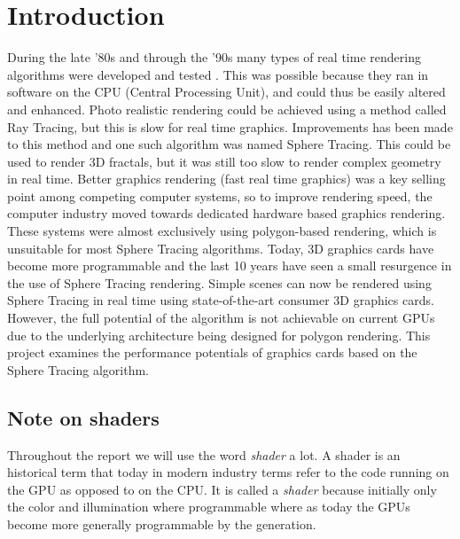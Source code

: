 \chapter{Introduction} 	

	During the late '80s and through the '90s many types of real time rendering
	algorithms were developed and tested \cite{Hart1989}. This was possible
	because they ran in software on the	CPU (Central Processing Unit), and
	could thus be easily altered and enhanced. Photo realistic rendering could
	be achieved using a method called Ray Tracing, but this is slow for real time
	graphics\cite{PeterShirleyMichaelAshikhmin2005}. Improvements has been made 
	to this method and one
	such algorithm was named Sphere Tracing. This could be used to render 3D
	fractals\cite{Hart1989}, but it was	still too slow to render complex
	geometry in real time\cite{Hart1989}. Better graphics rendering (fast real
	time graphics) was a key selling point among competing computer systems, so
	to improve rendering speed, the computer industry moved towards dedicated
	hardware based graphics rendering\cite{Houston2010}. These systems were
	almost exclusively using polygon-based	rendering, which is unsuitable for most
	Sphere Tracing algorithms. Today, 3D graphics cards have become more
	programmable and the last 10 years have seen a small resurgence in the use
	of Sphere Tracing rendering\cite{InigoQuilez}. Simple scenes can now be
	rendered using Sphere Tracing in real time using state-of-the-art consumer
	3D graphics cards. However, the full potential of the algorithm is not
	achievable on current GPUs due to the underlying architecture being
	designed for polygon rendering\cite{Houston2010}. This project examines the
	performance	potentials of graphics cards based on the Sphere Tracing 
	algorithm.

	\section{Note on shaders} 
		
		Throughout the report we will use the word \emph{shader} a lot. A
		shader is an historical term that today in modern industry terms refer to
		the code running on the GPU as opposed to on the CPU. It is called a
		\emph{shader} because initially only the color and illumination where
		programmable where as today the GPUs become more generally programmable by
		the generation. 


